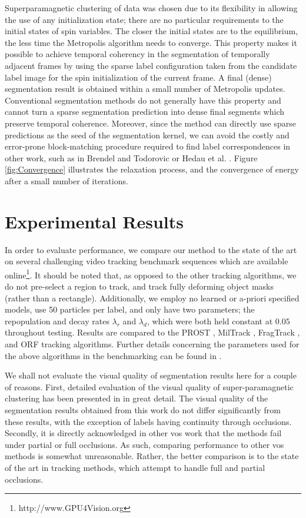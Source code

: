 Superparamagnetic clustering of data was chosen due to its flexibility in allowing the use of any initialization state; there are no particular requirements to the initial states of spin variables. The closer the initial states are to the equilibrium, the less time the Metropolis algorithm needs to converge. This property makes it possible to achieve temporal coherency in the segmentation of temporally adjacent frames by using the sparse label configuration taken from the candidate label image for the spin initialization of the current frame. A final (dense) segmentation result is obtained within a small number of Metropolis updates. Conventional segmentation methods do not generally have this property and cannot turn a sparse segmentation prediction into dense final segments which preserve temporal coherence. Moreover, since the method can directly use sparse predictions as the seed of the segmentation kernel, we can avoid the costly and error-prone block-matching procedure required to find label correspondences in other 
work, such as in Brendel and Todorovic \cite{SegTrackRegions} or Hedau et al.  \cite{MatchingUnstable}. Figure \ref{fig:Convergence} illustrates the relaxation process, and the convergence of energy after a small number of iterations. 

\section{Experimental Results}
\label{sec:Experimental Results}

In order to evaluate performance, we compare our method to the state of the art on several challenging video tracking benchmark sequences which are available online\footnote{http://www.GPU4Vision.org}. It should be noted that, as opposed to the other tracking algorithms, we do not pre-select a region to track, and track fully deforming object masks (rather than a rectangle). Additionally, we employ no learned or a-priori specified models, use 50 particles per label, and only have two parameters; the repopulation and decay rates $\lambda_r$ and $\lambda_d$, which were both held constant at $0.05$ throughout testing. Results are compared to the PROST \cite{PROST}, MilTrack \cite{MilTrack}, FragTrack \cite{FragTrack}, and ORF \cite{ORF} tracking algorithms. Further details concerning the parameters used for the above algorithms in the benchmarking can be found in \cite{PROST}.

We shall not evaluate the visual quality of segmentation results here for a couple of reasons. First, detailed evaluation of the visual quality of super-paramagnetic clustering has been presented in \cite{Abramov_RealtimeSegmentation} in great detail. The visual quality of the segmentation results obtained from this work do not differ significantly from these results, with the exception of labels having continuity through occlusions. Secondly, it is directly acknowledged in other \gls{vos} work that the methods fail under partial \cite{MSVS,PropValAgg} or full \cite{SegTrackRegions,MHVS} occlusions. As such, comparing performance to other \gls{vos} methods is somewhat unreasonable. Rather, the better comparison is to the state of the art in tracking methods, which attempt to handle full and partial occlusions.


